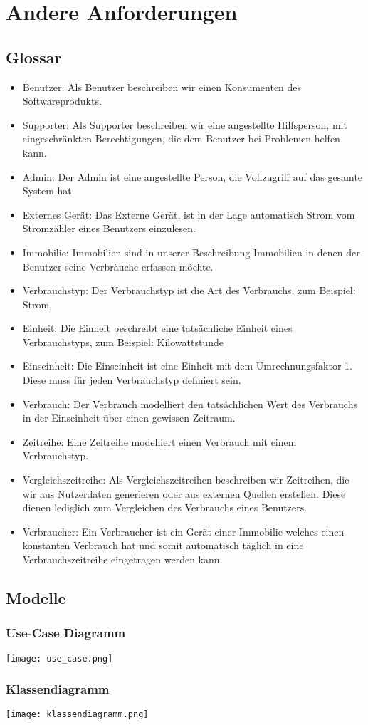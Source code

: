 \section{Andere Anforderungen}
\subsection{Glossar}
\begin{itemize}
\item Benutzer: Als Benutzer beschreiben wir einen Konsumenten des Softwareprodukts.
\item Supporter: Als Supporter beschreiben wir eine angestellte Hilfsperson, mit eingeschränkten Berechtigungen, die dem Benutzer bei Problemen helfen kann.
\item Admin: Der Admin ist eine angestellte Person, die Vollzugriff auf das gesamte System hat.
\item Externes Gerät: Das Externe Gerät, ist in der Lage automatisch Strom vom Stromzähler eines Benutzers einzulesen.
\item Immobilie: Immobilien sind in unserer Beschreibung Immobilien in denen der Benutzer seine Verbräuche erfassen möchte.
\item Verbrauchstyp: Der Verbrauchstyp ist die Art des Verbrauchs, zum Beispiel: Strom.
\item Einheit: Die Einheit beschreibt eine tatsächliche Einheit eines Verbrauchstyps, zum Beispiel: Kilowattstunde
\item Einseinheit: Die Einseinheit ist eine Einheit mit dem Umrechnungsfaktor 1. Diese muss für jeden Verbrauchstyp definiert sein.
\item Verbrauch: Der Verbrauch modelliert den tatsächlichen Wert des Verbrauchs in der Einseinheit über einen gewissen Zeitraum.
\item Zeitreihe: Eine Zeitreihe modelliert einen Verbrauch mit einem Verbrauchstyp.
\item Vergleichszeitreihe: Als Vergleichszeitreihen beschreiben wir Zeitreihen, die wir aus Nutzerdaten generieren oder aus externen Quellen erstellen. Diese dienen lediglich zum Vergleichen des Verbrauchs eines Benutzers.
\item Verbraucher: Ein Verbraucher ist ein Gerät einer Immobilie welches einen konstanten Verbrauch hat und somit automatisch täglich in eine Verbrauchszeitreihe eingetragen werden kann.
\end{itemize}
\subsection{Modelle}
\subsubsection{Use-Case Diagramm}
\texttt{[image: use\_case.png]}

\subsubsection{Klassendiagramm}
\texttt{[image: klassendiagramm.png]}
